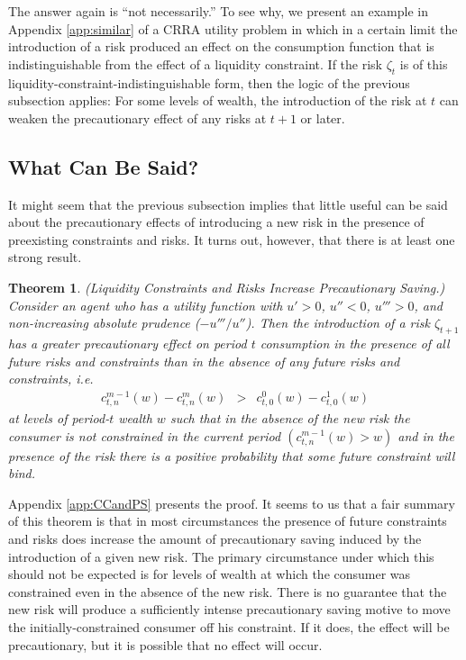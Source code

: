 \documentclass[titlepage]{\econtex}
\newtheorem{theorem}{Theorem}
\begin{document}
  The answer again is ``not necessarily.''  To see why, we present an example in Appendix \ref{app:similar} of a CRRA utility problem in which in a certain limit the introduction of a risk produced an effect on the consumption function that is indistinguishable from the effect of a liquidity constraint.  If the risk $\zeta_{t}$ is of this liquidity-constraint-indistinguishable form, then the logic of the previous subsection applies: For some levels of wealth, the introduction of the risk at $t$ can weaken the precautionary effect of any risks at $t+1$ or later.

  \subsection{What Can Be Said?}\label{subsubsec:WhatCanBeSaid}



  It might seem that the previous subsection implies that little useful can be said about the precautionary effects of introducing a new risk in the presence of preexisting constraints and risks. It turns out, however, that there is at least one strong result.

  \begin{theorem}\label{thm:CCandPS}\textit{(Liquidity Constraints and Risks Increase Precautionary Saving.) \\}
    Consider an agent who has a utility function with $u'> 0$, $u''< 0$, $u''' > 0$, and non-increasing absolute prudence ($-u'''/u''$). Then the introduction of a risk $\zeta_{t+1}$ has a greater precautionary effect on period $t$ consumption in the presence of all future risks and constraints than in the absence of any future risks and constraints, i.e.
    \begin{eqnarray}
      c_{t,n}^{m-1}(w) - c_{t,n}^{m}(w) & > & c_{t,0}^0(w)-c^{1}_{t,0}(w) \label{eq:whatcanbesaid}
    \end{eqnarray}
    at levels of period-$t$ wealth $w$ such that in the absence of the new risk the consumer is not constrained in the current period $(c_{t,n}^{m-1}(w) > w)$ and in the presence of the risk there is a positive probability that some future constraint will bind.
  \end{theorem}

  \noindent Appendix \ref{app:CCandPS} presents the proof. It seems to us that a fair summary of this theorem is that in most circumstances the presence of future constraints and risks does increase the amount of precautionary saving induced by the introduction of a given new risk.  The primary circumstance under which this should not be expected is for levels of wealth at which the consumer was constrained even in the absence of the new risk. There is no guarantee that the new risk will produce a sufficiently intense precautionary saving motive to move the initially-constrained consumer off his constraint.  If it does, the effect will be precautionary, but it is possible that no effect will occur.
\end{document}
